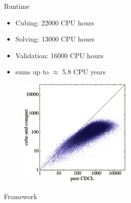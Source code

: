 \documentclass[c,8pt,xcolor...,x11names,usenames,dvipsnames]{beamer}
\begin{document}
\begin{frame}{Runtime}
	\begin{itemize}
		\item Cubing: 22000 CPU hours 
		\item Solving: 13000 CPU hours 
		\item Validation: 16000 CPU hours 
		\item sums up to $\approx$ 5.8 CPU years
	\end{itemize}
	\pause
	\begin{figure}
		\includegraphics[width=0.5\textwidth]{images/plot1.png} 
	\end{figure}
\end{frame}

\begin{frame}{Framework}
\begin{figure}
\end{figure}
\end{frame}
\end{document}
